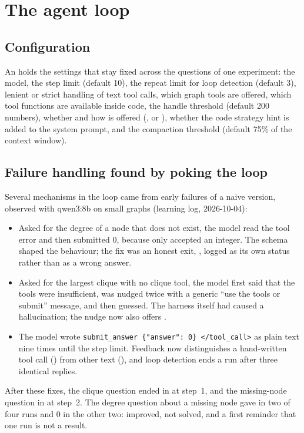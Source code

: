\section{The agent loop}

\subsection{Configuration}

An  holds the settings that stay fixed across the questions of one experiment: the model, the step
limit (default 10), the repeat limit for loop detection (default 3), lenient or strict handling of text tool calls,
which graph tools are offered, which tool functions are available inside code, the handle threshold (default 200
numbers), whether and how  is offered (,  or ), whether
the code strategy hint is added to the system prompt, and the compaction threshold (default 75\% of the context
window).

\subsection{Failure handling found by poking the loop}

Several mechanisms in the loop came from early failures of a naive version, observed with qwen3:8b on small graphs
(learning log, 2026-10-04):
\begin{itemize}
  \item Asked for the degree of a node that does not exist, the model read the tool error and then submitted 0,
        because  only accepted an integer. The schema shaped the behaviour; the fix was an honest
        exit, , logged as its own status rather than as a wrong answer.
  \item Asked for the largest clique with no clique tool, the model first said that the tools were insufficient,
        was nudged twice with a generic ``use the tools or submit'' message, and then guessed. The harness itself had
        caused a hallucination; the nudge now also offers .
  \item The model wrote \texttt{submit\_answer \{"answer": 0\} </tool\_call>} as plain text nine times until the step
        limit. Feedback now distinguishes a hand-written tool call () from other text
        (), and loop detection ends a run after three identical replies.
\end{itemize}
After these fixes, the clique question ended in  at step~1, and the missing-node question in
 at step~2. The degree question about a missing node gave  in two of four
runs and 0 in the other two: improved, not solved, and a first reminder that one run is not a result.

